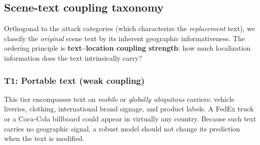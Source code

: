 \documentclass[12pt,a4paper]{article}
\begin{document}
\subsection{Scene-text coupling taxonomy}
Orthogonal to the attack categories (which characterize the \emph{replacement} text), we classify the \emph{original} scene text by its inherent geographic informativeness. The ordering principle is \textbf{text--location coupling strength}: how much localization information does the text intrinsically carry?

\begin{table}[H]
  \centering
  \caption{Scene-text coupling taxonomy. Each tier is defined by the geographic informativeness of the native text, with annotation criteria and expected robustness behavior.}
  \label{tab:coupling_taxonomy}
\end{table}

\subsubsection{T1: Portable text (weak coupling)}
This tier encompasses text on \emph{mobile} or \emph{globally ubiquitous} carriers: vehicle liveries, clothing, international brand signage, and product labels. A FedEx truck or a Coca-Cola billboard could appear in virtually any country. Because such text carries no geographic signal, a robust model should not change its prediction when the text is modified.
\end{document}
